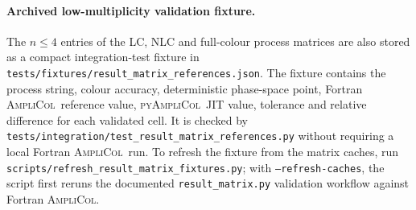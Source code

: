 \documentclass[10pt]{article}
\newcommand{\AC}{\textsc{AmpliCol}}
\newcommand{\PAC}{\textsc{pyAmpliCol}}
\begin{document}
\paragraph{Archived low-multiplicity validation fixture.}
The \(n\le4\) entries of the LC, NLC and full-colour process matrices are also
stored as a compact integration-test fixture in
\texttt{tests/fixtures/result\_matrix\_references.json}.  The fixture contains
the process string, colour accuracy, deterministic phase-space point, Fortran
\AC\ reference value, \PAC\ JIT value, tolerance and relative difference for
each validated cell.  It is checked by
\texttt{tests/integration/test\_result\_matrix\_references.py} without requiring
a local Fortran \AC\ run.  To refresh the fixture from the matrix caches, run
\texttt{scripts/refresh\_result\_matrix\_fixtures.py}; with
\texttt{--refresh-caches}, the script first reruns the documented
\texttt{result\_matrix.py} validation workflow against Fortran \AC.
\end{document}
